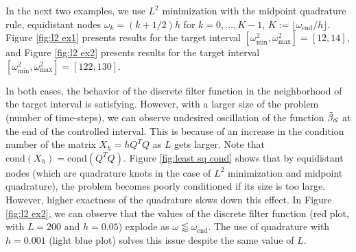 \documentclass[a4paper,11pt,bibliography=totoc,listof=totoc,headinclude=true,cleardoublepage=empty,oneside]{scrbook}
\newcommand{\dffv}{\Tilde{\beta}_{\Vec{\alpha}}}
\newcommand{\e}{\mathrm{end}}
\begin{document}


In the next two examples, we use $L^2$ minimization with the midpoint quadrature rule, equidistant nodes $\omega_k = (k+1/2)h$ for $k=0,\dots, K-1$, $K:= \lfloor\omega_\e/h\rfloor$. Figure \ref{fig:l2 ex1} presents results for the target interval $\left[\omega_{\min}^2, \omega_{\max}^2\right] = [12, 14]$, and Figure \ref{fig:l2 ex2} presents results for the target interval $\left[\omega_{\min}^2, \omega_{\max}^2\right] = [122, 130]$.

In both cases, the behavior of the discrete filter function in the neighborhood of the target interval is satisfying. However, with a larger size of the problem (number of time-steps), we can observe undesired oscillation of the function $\dffv$ at the end of the controlled interval. This is because of an increase in the condition number of the matrix $X_h = hQ^TQ$ as $L$ gets larger. Note that $\mathrm{cond}(X_h) = \mathrm{cond}(Q^TQ)$. Figure \ref{fig:least sq cond} shows that by equidistant nodes (which are quadrature knots in the case of $L^2$ minimization and midpoint quadrature), the problem becomes poorly conditioned if its size is too large. However, higher exactness of the quadrature slows down this effect. In Figure \ref{fig:l2 ex2}, we can observe that the values of the discrete filter function (red plot, with $L=200$ and $h=0.05$) explode as $\omega \lessapprox \omega_\e$. The use of quadrature with $h=0.001$ (light blue plot) solves this issue despite the same value of $L$.
\end{document}
